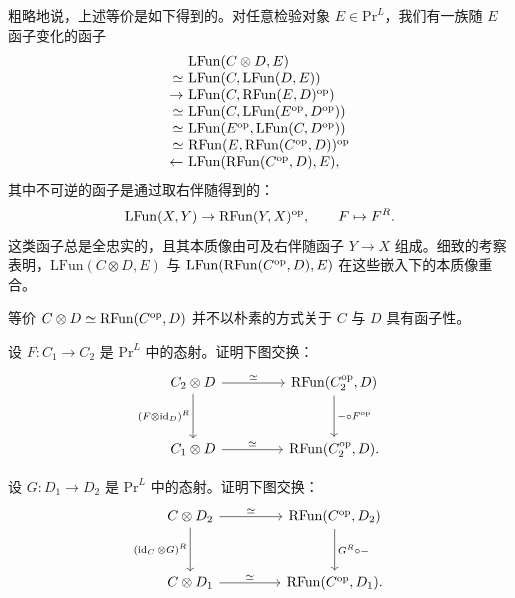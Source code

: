 \begin{remark}\label{L25-3.8}
粗略地说，上述等价是如下得到的。对任意检验对象 $E\in\mathrm{Pr}^{L}$，我们有一族随 $E$ 函子变化的函子
\[
\begin{array}{r@{\ }l}
 & \mathrm{LFun}(C\otimes D,E)\\
\simeq & \mathrm{LFun}(C,\mathrm{LFun}(D,E))\\
\to & \mathrm{LFun}(C,\mathrm{RFun}(E,D)^{\op})\\
\simeq & \mathrm{LFun}(C,\mathrm{LFun}(E^{\op},D^{\op}))\\
\simeq & \mathrm{LFun}(E^{\op},\mathrm{LFun}(C,D^{\op}))\\
\simeq & \mathrm{RFun}(E,\mathrm{RFun}(C^{\op},D))^{\op}\\
\leftarrow & \mathrm{LFun}(\mathrm{RFun}(C^{\op},D),E),
\end{array}
\]
其中不可逆的函子是通过取右伴随得到的：
\[
\mathrm{LFun}(X,Y)\to\mathrm{RFun}(Y,X)^{\mathrm{op}},\qquad F\mapsto F^{R}.
\]
这类函子总是全忠实的，且其本质像由可及右伴随函子 $Y\to X$ 组成。细致的考察表明，$\mathrm{LFun}(C\otimes D,E)$ 与 $\mathrm{LFun}(\mathrm{RFun}(C^{\mathrm{op}},D),E)$ 在这些嵌入下的本质像重合。
\end{remark}

\begin{warning}\label{L25-3.9}
等价 $C\otimes D\simeq\mathrm{RFun}(C^{\mathrm{op}},D)$ 并不以朴素的方式关于 $C$ 与 $D$ 具有函子性。
\end{warning}

\begin{exercise}\label{L25-3.10}
设 $F\colon C_{1}\to C_{2}$ 是 $\mathrm{Pr}^{L}$ 中的态射。证明下图交换：
\[
\begin{tikzcd}[column sep=4.4em,row sep=3.0em]
C_{2}\otimes D \arrow[r,"\simeq"] \arrow[d,"(F\otimes\id_{D})^{R}"'] & \mathrm{RFun}(C_{2}^{\op},D) \arrow[d,"{-\circ F^{\op}}"]\\
C_{1}\otimes D \arrow[r,"\simeq"] & \mathrm{RFun}(C_{2}^{\op},D).
\end{tikzcd}
\]
\end{exercise}


\begin{exercise}\label{L25-3.11}
设 $G\colon D_{1}\to D_{2}$ 是 $\mathrm{Pr}^{L}$ 中的态射。证明下图交换：
\[
\begin{tikzcd}[column sep=4.4em,row sep=3.0em]
C\otimes D_{2} \arrow[r,"\simeq"] \arrow[d,"(\id_{C}\otimes G)^{R}"'] & \mathrm{RFun}(C^{\op},D_{2}) \arrow[d,"{G^{R}\circ-}"]\\
C\otimes D_{1} \arrow[r,"\simeq"] & \mathrm{RFun}(C^{\op},D_{1}).
\end{tikzcd}
\]
\end{exercise}

